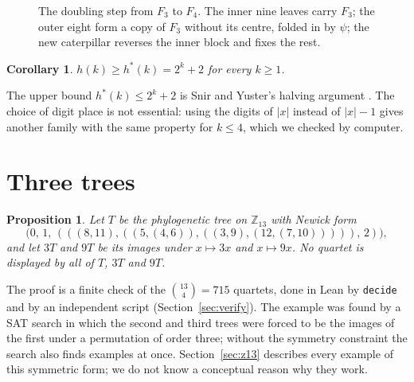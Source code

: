 \documentclass[11pt]{amsart}
\newtheorem{proposition}[theorem]{Proposition}
\newtheorem{corollary}[theorem]{Corollary}
\theoremstyle{definition}
\begin{document}
\begin{figure}[ht]
\centering
{}
\caption{The doubling step from $F_3$ to $F_4$. The inner nine leaves carry $F_3$; the outer eight form a copy of
$F_3$ without its centre, folded in by $\psi$; the new caterpillar reverses the inner block and fixes the rest.}
\label{fig:double}
\end{figure}

\begin{corollary}
$h(k)\ge h^*(k)=2^k+2$ for every $k\ge1$.
\end{corollary}

The upper bound $h^*(k)\le 2^k+2$ is Snir and Yuster's halving argument \cite[\S5]{SY}. The choice of digit place
is not essential: using the digits of $|x|$ instead of $|x|-1$ gives another family with the same property for
$k\le4$, which we checked by computer.

\section{Three trees}\label{sec:h3}

\begin{proposition}\label{prop:13}
Let $T$ be the phylogenetic tree on $\mathbb{Z}_{13}$ with Newick form
\[
\bigl(0,\,1,\,(((8,11),((5,(4,6)),((3,9),(12,(7,10))))),\,2)\bigr),
\]
and let $3T$ and $9T$ be its images under $x\mapsto3x$ and $x\mapsto9x$. No quartet is displayed by all of $T$,
$3T$ and $9T$.
\end{proposition}

The proof is a finite check of the $\binom{13}{4}=715$ quartets, done in Lean by \texttt{decide} and by an
independent script (Section~\ref{sec:verify}). The example was found by a SAT search in which the second and third
trees were forced to be the images of the first under a permutation of order three; without the symmetry
constraint the search also finds examples at once. Section~\ref{sec:z13} describes every example of this symmetric
form; we do not know a conceptual reason why they work.
\end{document}
